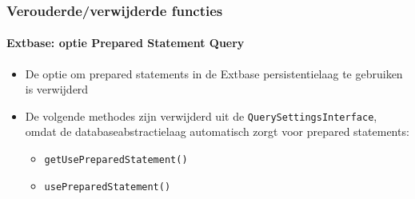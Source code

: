 \begin{frame}[fragile]
	\frametitle{Verouderde/verwijderde functies}
	\framesubtitle{Extbase: optie Prepared Statement Query}

	\begin{itemize}

		\item De optie om prepared statements in de Extbase persistentielaag te gebruiken is verwijderd

		\item De volgende methodes zijn verwijderd uit de \texttt{QuerySettingsInterface},
			omdat de databaseabstractielaag automatisch zorgt voor prepared statements:

			\begin{itemize}
				\item \texttt{getUsePreparedStatement()}
				\item \texttt{usePreparedStatement()}
			\end{itemize}

	\end{itemize}

\end{frame}

